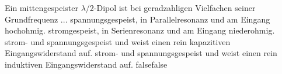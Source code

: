     {Ein mittengespeister $\lambda$/2-Dipol ist bei geradzahligen Vielfachen seiner Grundfrequenz ...}
    {spannungsgespeist, in Parallelresonanz und am Eingang hochohmig.}
    {stromgespeist, in Serienresonanz und am Eingang niederohmig.}
    {strom- und spannungsgespeist und weist einen rein kapazitiven Eingangswiderstand auf.}
    {strom- und spannungsgespeist und weist einen rein induktiven Eingangswiderstand auf.}
    {false}{false}